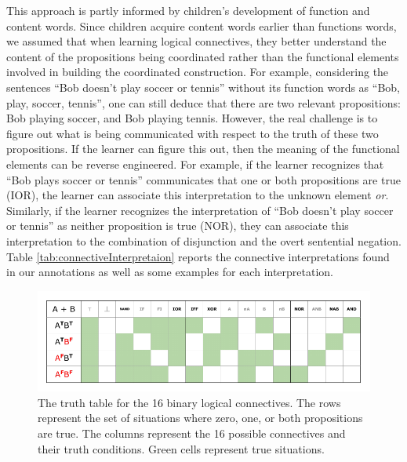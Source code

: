 \documentclass[oneside]{report}
\theoremstyle{definition}
\theoremstyle{definition}
\theoremstyle{definition}
\theoremstyle{remark}
\begin{document}
This approach is partly informed by children's development of function
and content words. Since children acquire content words earlier than
functions words, we assumed that when learning logical connectives, they
better understand the content of the propositions being coordinated
rather than the functional elements involved in building the coordinated
construction. For example, considering the sentences ``Bob doesn't play
soccer or tennis'' without its function words as ``Bob, play, soccer,
tennis'', one can still deduce that there are two relevant propositions:
Bob playing soccer, and Bob playing tennis. However, the real challenge
is to figure out what is being communicated with respect to the truth of
these two propositions. If the learner can figure this out, then the
meaning of the functional elements can be reverse engineered. For
example, if the learner recognizes that ``Bob plays soccer or tennis''
communicates that one or both propositions are true (IOR), the learner
can associate this interpretation to the unknown element \emph{or}.
Similarly, if the learner recognizes the interpretation of ``Bob doesn't
play soccer or tennis'' as neither proposition is true (NOR), they can
associate this interpretation to the combination of disjunction and the
overt sentential negation. Table \ref{tab:connectiveInterpretaion}
reports the connective interpretations found in our annotations as well
as some examples for each interpretation.
\begin{figure}[tb]

{\centering \includegraphics{figs/logicalConnectives-1} 

}

\caption{The truth table for the 16 binary logical connectives. The rows represent the set of situations where zero, one, or both propositions are true. The columns represent the 16 possible connectives and their truth conditions. Green cells represent true situations.}\label{fig:logicalConnectives}
\end{figure}
\end{document}
